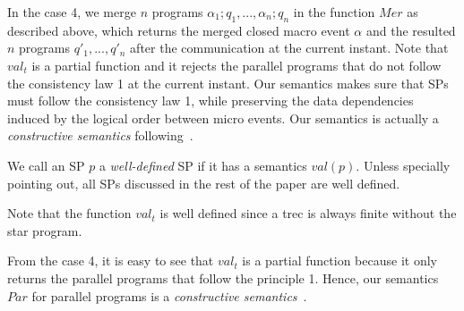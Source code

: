\documentclass{fcs}
\newcommand{\val}[0]{\mathit{val}}
\newcommand{\Par}[0]{\mathit{Par}}
\DeclareMathOperator{\seq}{;}
\newcommand{\Must}[0]{\mathit{Must}}
\newcommand{\Cannot}[0]{\mathit{Cant}}
\newcommand{\valt}[0]{\val_t}
\newcommand{\Merge}[0]{\mathit{Mer}}
\newcommand{\SV}[0]{\Xi}
\begin{document}
In the case 4, we merge $n$ programs $\alpha_1\seq q_1,...,\alpha_n\seq q_n$ in the function $\Merge$ as described above,
which returns the merged closed macro event $\alpha$ and the resulted $n$ programs $q'_1,...,q'_n$ after the communication at the current instant.
Note that $\valt$ is a partial function and it rejects the parallel programs that do not follow the consistency law 1 at the current instant.
Our semantics makes sure that SPs must follow the consistency law 1, while preserving the data dependencies induced by the logical order between micro events.
Our semantics is actually a \emph{constructive semantics} following~\cite{Berry99}.

We call an SP $p$ a \emph{well-defined} SP if it has a semantics $\val(p)$.
Unless specially pointing out, all SPs discussed in the rest of the paper are well defined.

Note that the function $\valt$ is well defined since a trec is always finite without the star program.

\ifx
From the case 4, it is easy to see that $\valt$ is a partial function because it only returns the parallel programs that follow the principle 1.
Hence, our semantics $\Par$ for parallel programs is a \emph{constructive semantics}~\cite{???}.
\fi
\end{document}
